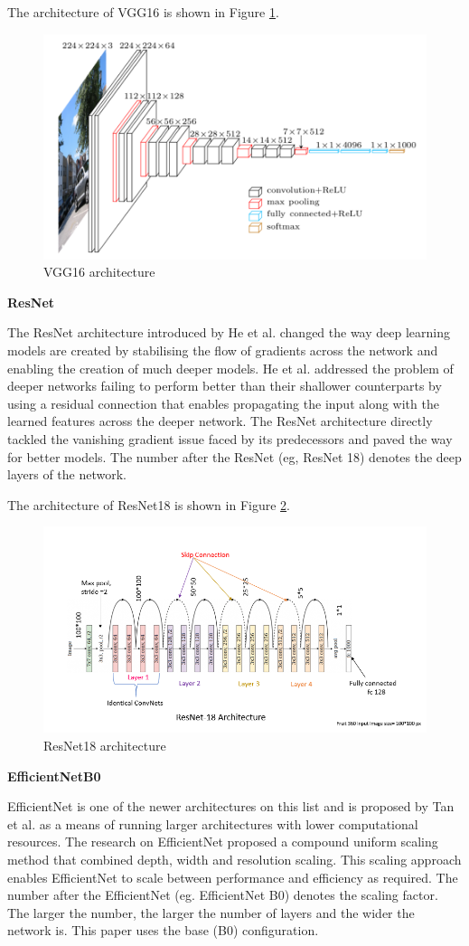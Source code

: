 \documentclass[a4paper,11pt,openright]{book}
\begin{document}
The architecture of VGG16 is shown in Figure \ref{fig:vgg16}.

\begin{figure}[!htb]
    \centering
    \includegraphics[width=.6\linewidth]{images/vggarch.png}
    \caption{VGG16 architecture}
    \label{fig:vgg16}
\end{figure}

\textbf{ResNet}

The ResNet architecture \cite{heDeepResidualLearning2016} introduced by He et al. changed the way deep learning models are created by stabilising the flow of gradients across the network and enabling the creation of much deeper models. He et al. addressed the problem of deeper networks failing to perform better than their shallower counterparts by using a residual connection that enables propagating the input along with the learned features across the deeper network. The ResNet architecture directly tackled the vanishing gradient issue faced by its predecessors and paved the way for better models. The number after the ResNet (eg, ResNet 18) denotes the deep layers of the network.

The architecture of ResNet18 is shown in Figure \ref{fig:resnet18}.
\begin{figure}[!htb]
    \centering
    \includegraphics[width=.6\linewidth]{images/resnetarch.png}
    \caption{ResNet18 architecture}
    \label{fig:resnet18}
\end{figure}

\textbf{EfficientNetB0}

EfficientNet is one of the newer architectures on this list and is proposed by Tan et al. \cite{tanEfficientnetRethinkingModel2019} as a means of running larger architectures with lower computational resources. The research on EfficientNet proposed a compound uniform scaling method that combined depth, width and resolution scaling. This scaling approach enables EfficientNet to scale between performance and efficiency as required. The number after the EfficientNet (eg. EfficientNet B0) denotes the scaling factor. The larger the number, the larger the number of layers and the wider the network is. This paper uses the base (B0) configuration.
\end{document}
